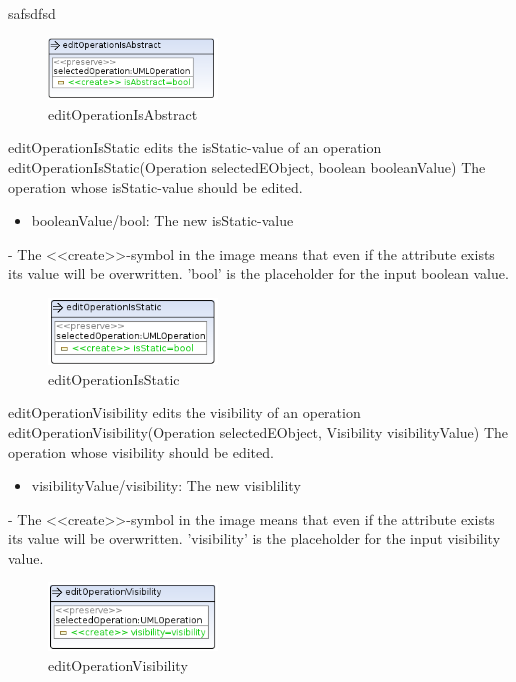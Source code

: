 {safsdfsd}
\begin{figure}[H]
  \centering
  \includegraphics[width=0.4\textwidth]{pics/editOperationIsAbstract.png}
  \caption{editOperationIsAbstract}
  \label{editOperationIsAbstract}
\end{figure}
\op
{editOperationIsStatic}
{edits the isStatic-value of an operation}
{editOperationIsStatic(Operation selectedEObject, boolean booleanValue)}
{The operation whose isStatic-value should be edited.}
{
\begin{itemize}
 \item booleanValue/bool: The new isStatic-value
\end{itemize}
}
{-}
{The \textless\textless create\textgreater\textgreater  -symbol in the image
means that even if the attribute exists its value will be overwritten.
'bool' is the placeholder for the input boolean value.}
\begin{figure}[H]
  \centering
  \includegraphics[width=0.4\textwidth]{pics/editOperationIsStatic.png}
  \caption{editOperationIsStatic}
  \label{editOperationIsStatic}
\end{figure}
\op
{editOperationVisibility}
{edits the visibility of an operation}
{editOperationVisibility(Operation selectedEObject, Visibility visibilityValue)}
{The operation whose visibility should be edited.}
{
\begin{itemize}
 \item visibilityValue/visibility: The new visiblility
\end{itemize}
}
{-}
{The \textless\textless create\textgreater\textgreater  -symbol in the image
means that even if the attribute exists its value will be overwritten.
'visibility' is the placeholder for the input visibility value.}
\begin{figure}[H]
  \centering
  \includegraphics[width=0.4\textwidth]{pics/editOperationVisibility.png}
  \caption{editOperationVisibility}
  \label{editOperationVisibility}
\end{figure}
